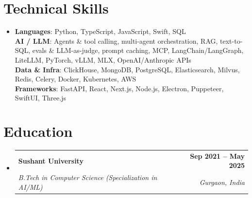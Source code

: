 \documentclass[letterpaper,10pt]{article}
\makeatletter
\newcommand{\resumeSubheading}[4]{
  \vspace{-1pt}\item
    \begin{tabular*}{1.0\textwidth}[t]{l@{\extracolsep{\fill}}r}
      \textbf{#1} & \textbf{#2} \\
      \textit{#3} & \textit{#4} \\
    \end{tabular*}\vspace{-6pt}
}
\newcommand{\resumeSubHeadingListStart}{\begin{itemize}[leftmargin=0.0in, label={}]}
\newcommand{\resumeSubHeadingListEnd}{\end{itemize}}
\makeatother
\begin{document}
\section{Technical Skills}
 \begin{itemize}[leftmargin=0in, label={}]
    \item{
     \textbf{Languages}{: Python, TypeScript, JavaScript, Swift, SQL} \\
     \textbf{AI / LLM}{: Agents \& tool calling, multi-agent orchestration, RAG, text-to-SQL, evals \& LLM-as-judge, prompt caching, MCP, LangChain/LangGraph, LiteLLM, PyTorch, vLLM, MLX, OpenAI/Anthropic APIs} \\
     \textbf{Data \& Infra}{: ClickHouse, MongoDB, PostgreSQL, Elasticsearch, Milvus, Redis, Celery, Docker, Kubernetes, AWS} \\
     \textbf{Frameworks}{: FastAPI, React, Next.js, Node.js, Electron, Puppeteer, SwiftUI, Three.js}
    }
 \end{itemize}
\vspace{-14pt}

\section{Education}
  \resumeSubHeadingListStart
    \resumeSubheading
      {Sushant University}{Sep 2021 -- May 2025}
      {B.Tech in Computer Science (Specialization in AI/ML)}{Gurgaon, India}
  \resumeSubHeadingListEnd
\end{document}
